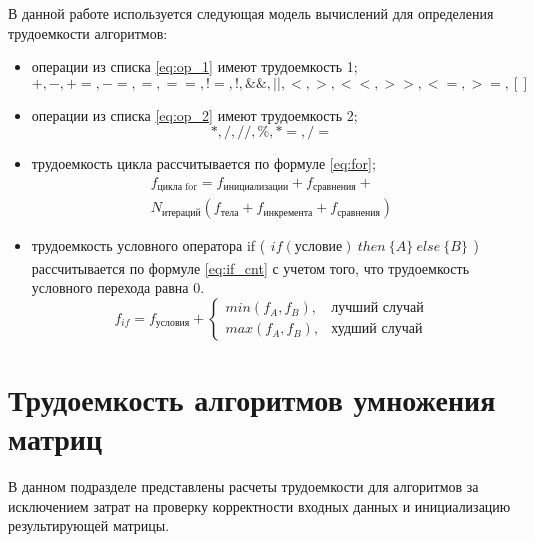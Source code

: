 \documentclass[12pt]{report}
\begin{document}
    В данной работе используется следующая модель вычислений для определения трудоемкости алгоритмов:
    \begin{itemize}
        \item операции из списка \ref{eq:op_1} имеют трудоемкость 1;
        \begin{equation}
            \label{eq:op_1}
            +, -, +=, -=, =, ==, !=, !, \&\&, ||, <, >, <<, >>, <=, >=, []
        \end{equation}
        \item операции из списка \ref{eq:op_2} имеют трудоемкость 2;
        \begin{equation}
            \label{eq:op_2}
            *, /, //, \%, *=, /=
        \end{equation}
        \item трудоемкость цикла рассчитывается по формуле \ref{eq:for};
        \begin{equation}
            \label{eq:for}
            \begin{array}{ll}
                f_{\text{цикла for}} = f_{\text{инициализации}} + f_{\text{сравнения}} + \\
                N_{\text{итераций}} (f_{\text{тела}} + f_{\text{инкремента}} + f_{\text{сравнения}})
            \end{array}
        \end{equation}
        \item трудоемкость условного оператора if ($
        \begin{array}{ll}
            if (\text{условие}) \ then \ \{A\}\ else \	 \{B\}
        \end{array}
        $) \\ рассчитывается по формуле \ref{eq:if_cnt} с учетом того, что трудоемкость условного перехода равна 0. \\
        \begin{equation}
            \label{eq:if_cnt}
            f_{if} = f_{\text{условия}} +
            \begin{cases}
                min(f_A, f_B), & \textrm{лучший случай}\\
                max(f_A, f_B), & \textrm{худший случай}
            \end{cases}
        \end{equation}
    \end{itemize}


    \section{Трудоемкость алгоритмов умножения матриц}
    В данном подразделе представлены расчеты трудоемкости для алгоритмов
    за исключением затрат на проверку корректности входных данных и инициализацию результирующей матрицы.
\end{document}
